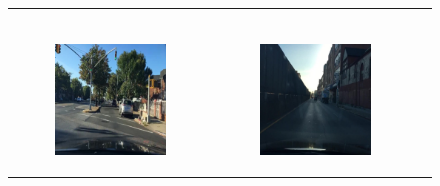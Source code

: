 \begin{figure}
\begin{tabular}{p{\horspace} p{\horspace} p{\horspace}}
\begin{subfigure}[b]{\subfigwidth}
    \end{subfigure} \\
    \begin{subfigure}[b]{\subfigwidth}
        \includegraphics[width=\subfigwidth]{images/gpt4/s4.jpg}
    \end{subfigure}
    \hfill &
    \begin{subfigure}[b]{\subfigwidth}
        \includegraphics[width=\subfigwidth]{images/gpt4/s5.jpg}

\end{subfigure}
\end{tabular}
\end{figure}
